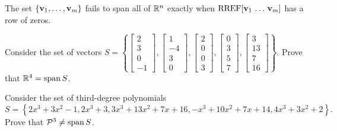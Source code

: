 \begin{applicationActivities}{4}{10}
\begin{fact}
  The set \(\{\mathbf v_1,\dots,\mathbf v_m\}\) fails to span all of \(\mathbb{R}^n\)
  exactly when \(\operatorname{RREF}[\mathbf v_1\,\dots\,\mathbf v_m]\) has a row of zeros.
\end{fact}

\begin{activity}{5}
  Consider the set of vectors \(S=\left\{
  \begin{bmatrix}2\\3\\0\\-1\end{bmatrix},
  \begin{bmatrix}1\\-4\\3\\0\end{bmatrix},
  \begin{bmatrix}2\\0\\0\\3\end{bmatrix},
  \begin{bmatrix}0\\3\\5\\7\end{bmatrix},
  \begin{bmatrix}3\\13\\7\\16\end{bmatrix}
  \right\}
  \).
  Prove that
  \(\mathbb{R}^4=\operatorname{span} S\).
\end{activity}

\begin{activity}{10}
  Consider the set of third-degree polynomials \[S=\left\{
  2x^3+3x^2-1,
  2x^3+3,
  3x^3+13x^2+7x+16,
  -x^3+10x^2+7x+14,
  4x^3+3x^2+2
  \right\}
  .\]
  Prove that
  \(\mathcal{P}^3\not=\operatorname{span} S\).
\end{activity}


\end{applicationActivities}
